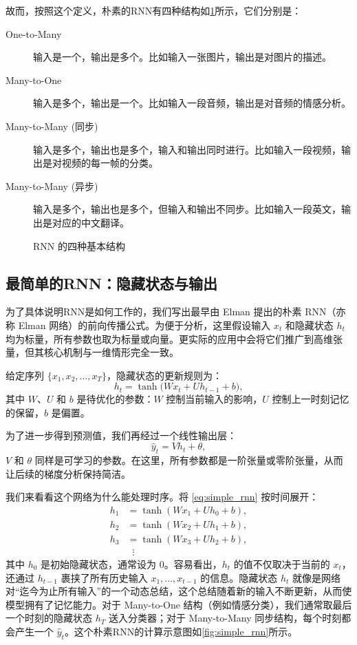 故而，按照这个定义，朴素的RNN有四种结构如\cref{fig:rnn_structures}所示，它们分别是：
\begin{description}
    \item[One-to-Many] 输入是一个，输出是多个。比如输入一张图片，输出是对图片的描述。
    \item[Many-to-One] 输入是多个，输出是一个。比如输入一段音频，输出是对音频的情感分析。
    \item[Many-to-Many (同步)] 输入是多个，输出也是多个，输入和输出同时进行。比如输入一段视频，输出是对视频的每一帧的分类。
    \item[Many-to-Many (异步)] 输入是多个，输出也是多个，但输入和输出不同步。比如输入一段英文，输出是对应的中文翻译。 
\end{description}

\begin{figure}
    \centering
    
    \caption{RNN 的四种基本结构}
    \label{fig:rnn_structures}
\end{figure}

\subsection{最简单的RNN：隐藏状态与输出}

为了具体说明RNN是如何工作的，我们写出最早由 Elman\cite{elman1990finding} 提出的朴素 RNN（亦称 Elman 网络）的前向传播公式。为便于分析，这里假设输入 $x_t$ 和隐藏状态 $h_t$ 均为标量，所有参数也取为标量或向量。更实际的应用中会将它们推广到高维张量，但其核心机制与一维情形完全一致。

给定序列 $\{x_1, x_2, \dots, x_T\}$，隐藏状态的更新规则为：
\begin{equation}\label{eq:simple_rnn}
    h_t = \tanh\!\big(W x_t + U h_{t-1} + b\big),
\end{equation}
其中 $W$、$U$ 和 $b$ 是待优化的参数：$W$ 控制当前输入的影响，$U$ 控制上一时刻记忆的保留，$b$ 是偏置。

为了进一步得到预测值，我们再经过一个线性输出层：
\begin{equation}\label{eq:simple_rnn_out}
    \hat{y}_t = V h_t + \theta,
\end{equation}
$V$ 和 $\theta$ 同样是可学习的参数。在这里，所有参数都是一阶张量或零阶张量，从而让后续的梯度分析保持简洁。

我们来看看这个网络为什么能处理时序。将 \eqref{eq:simple_rnn} 按时间展开：
\begin{align}
    h_1 &= \tanh(W x_1 + U h_0 + b), \\
    h_2 &= \tanh(W x_2 + U h_1 + b), \\
    h_3 &= \tanh(W x_3 + U h_2 + b), \\
    &\;\;\vdots
\end{align}
其中 $h_0$ 是初始隐藏状态，通常设为 0。容易看出，$h_t$ 的值不仅取决于当前的 $x_t$，还通过 $h_{t-1}$ 裹挟了所有历史输入 $x_1, \dots, x_{t-1}$ 的信息。隐藏状态 $h_t$ 就像是网络对“迄今为止所有输入”的一个动态总结，这个总结随着新的输入不断更新，从而使模型拥有了记忆能力。对于 Many-to-One 结构（例如情感分类），我们通常取最后一个时刻的隐藏状态 $h_T$ 送入分类器；对于 Many-to-Many 同步结构，每个时刻都会产生一个 $\hat{y}_t$。这个朴素RNN的计算示意图如\cref{fig:simple_rnn}所示。

